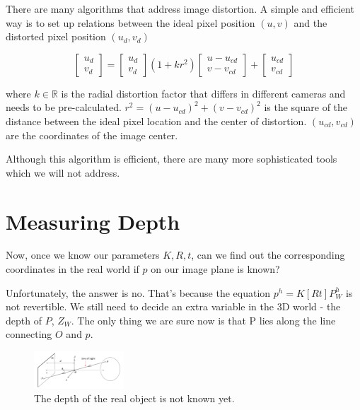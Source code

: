 \documentclass[]{article}
\begin{document}
	There are many algorithms that address image distortion. A simple and efficient way is to set up relations between the ideal pixel position $(u,v)$ and the distorted pixel position $(u_d,v_d)$
	
	\begin{equation}
	\begin{bmatrix}
	u_d \\
	v_d
	\end{bmatrix}
	=
	\begin{bmatrix}
	u_d \\
	v_d
	\end{bmatrix}
	(1+kr^2)
	\begin{bmatrix}
	u-u_{cd} \\
	v-v_{cd}
	\end{bmatrix}
	+
	\begin{bmatrix}
	u_{cd} \\
	v_{cd}
	\end{bmatrix}
	\end{equation}
	
	where $k \in \mathbb{R}$ is the radial distortion factor that differs in different cameras and needs to be pre-calculated. $r^2=(u-u_{cd})^2+(v-v_{cd})^2$ is the square of the distance between the ideal pixel location and the center of distortion. $(u_{cd},v_{cd})$ are the coordinates of the image center.
	
	Although this algorithm is efficient, there are many more sophisticated tools which we will not address.
	
	\section{Measuring Depth}
	Now, once we know our parameters $K,R,t$, can we find out the corresponding coordinates in the real world if $p$ on our image plane is known?
	
	Unfortunately, the answer is no. That's because the equation $p^h=K[R t]P_W^h$ is not revertible. We still need to decide an extra variable in the 3D world - the depth of $P$, $Z_W$. The only thing we are sure now is that P lies along the line connecting $O$ and $p$.
	
	\begin{figure}[H]
		\includegraphics[width=0.3\textwidth]{measuring_depth.png}
		\centering
		\caption{The depth of the real object is not known yet.}
		\label{fig:measuring_depth}
	\end{figure}
	
\end{document}
